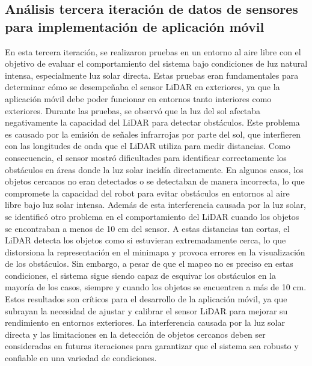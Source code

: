 \subsection{An\'alisis tercera iteraci\'on de datos de sensores para implementaci\'on de aplicaci\'on m\'ovil} %
\label{sub:An\'alisis tercera }
    En esta tercera iteraci\'on, se realizaron pruebas en un entorno al aire libre con el objetivo de evaluar el 
        comportamiento del sistema bajo condiciones de luz natural intensa, especialmente luz solar directa. 
        Estas pruebas eran fundamentales para determinar c\'omo se desempe\~naba el sensor LiDAR en exteriores, 
        ya que la aplicaci\'on m\'ovil debe poder funcionar en entornos tanto interiores como exteriores.
    \vskip 0.5cm
    Durante las pruebas, se observ\'o que la luz del sol afectaba negativamente la capacidad del LiDAR para 
        detectar obst\'aculos. Este problema es causado por la emisi\'on de se\~nales infrarrojas por parte del 
        sol, que interfieren con las longitudes de onda que el LiDAR utiliza para medir distancias. Como 
        consecuencia, el sensor mostr\'o dificultades para identificar correctamente los obst\'aculos en \'areas 
        donde la luz solar incid\'ia directamente. En algunos casos, los objetos cercanos no eran detectados 
        o se detectaban de manera incorrecta, lo que compromete la capacidad del robot para evitar obst\'aculos 
        en entornos al aire libre bajo luz solar intensa.
    \vskip 0.5cm
    Adem\'as de esta interferencia causada por la luz solar, se identific\'o otro problema en el comportamiento del 
        LiDAR cuando los objetos se encontraban a menos de 10 cm del sensor. A estas distancias tan cortas, 
        el LiDAR detecta los objetos como si estuvieran extremadamente cerca, lo que distorsiona la 
        representaci\'on en el minimapa y provoca errores en la visualizaci\'on de los obst\'aculos. Sin embargo, 
        a pesar de que el mapeo no es preciso en estas condiciones, el sistema sigue siendo capaz de esquivar 
        los obst\'aculos en la mayor\'ia de los casos, siempre y cuando los objetos se encuentren a m\'as de 10 cm.
    \vskip 0.5cm
    Estos resultados son cr\'iticos para el desarrollo de la aplicaci\'on m\'ovil, ya que subrayan la necesidad de ajustar 
        y calibrar el sensor LiDAR para mejorar su rendimiento en entornos exteriores. La interferencia causada por la 
        luz solar directa y las limitaciones en la detecci\'on de objetos cercanos deben ser consideradas en futuras 
        iteraciones para garantizar que el sistema sea robusto y confiable en una variedad de condiciones.

